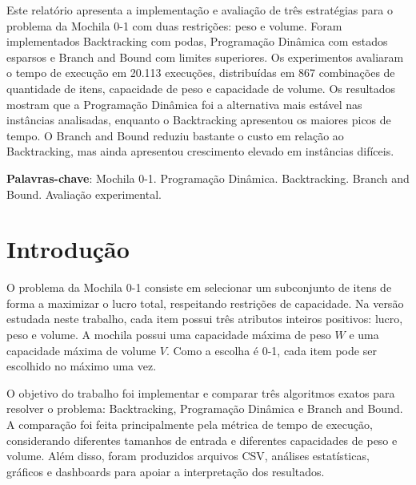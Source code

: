 \documentclass[
    12pt,
    oneside,
    a4paper,
    brazil,
    article
]{abntex2}
\begin{document}

\pretextual

\imprimircapa
\imprimirfolhaderosto*

\begin{resumo}
Este relatório apresenta a implementação e avaliação de três estratégias para o problema da Mochila 0-1 com duas restrições: peso e volume. Foram implementados Backtracking com podas, Programação Dinâmica com estados esparsos e Branch and Bound com limites superiores. Os experimentos avaliaram o tempo de execução em 20.113 execuções, distribuídas em 867 combinações de quantidade de itens, capacidade de peso e capacidade de volume. Os resultados mostram que a Programação Dinâmica foi a alternativa mais estável nas instâncias analisadas, enquanto o Backtracking apresentou os maiores picos de tempo. O Branch and Bound reduziu bastante o custo em relação ao Backtracking, mas ainda apresentou crescimento elevado em instâncias difíceis.

\vspace{\onelineskip}
\noindent
\textbf{Palavras-chave}: Mochila 0-1. Programação Dinâmica. Backtracking. Branch and Bound. Avaliação experimental.
\end{resumo}

\tableofcontents*
\cleardoublepage

\textual

\section{Introdução}

O problema da Mochila 0-1 consiste em selecionar um subconjunto de itens de forma a maximizar o lucro total, respeitando restrições de capacidade. Na versão estudada neste trabalho, cada item possui três atributos inteiros positivos: lucro, peso e volume. A mochila possui uma capacidade máxima de peso $W$ e uma capacidade máxima de volume $V$. Como a escolha é 0-1, cada item pode ser escolhido no máximo uma vez.

O objetivo do trabalho foi implementar e comparar três algoritmos exatos para resolver o problema: Backtracking, Programação Dinâmica e Branch and Bound. A comparação foi feita principalmente pela métrica de tempo de execução, considerando diferentes tamanhos de entrada e diferentes capacidades de peso e volume. Além disso, foram produzidos arquivos CSV, análises estatísticas, gráficos e dashboards para apoiar a interpretação dos resultados.
\end{document}
